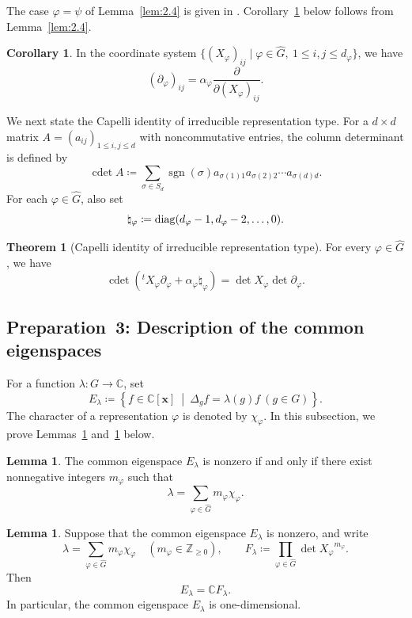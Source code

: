 \documentclass[12pt,a4paper]{article}
\theoremstyle{definition}
\newtheorem{thm}[definition]{Theorem}
\newtheorem{lem}[definition]{Lemma}
\newtheorem{cor}[definition]{Corollary}
\numberwithin{definition}{section}
\newcommand{\diag}{{\rm diag}}
\DeclareMathOperator{\sgn}{sgn}
\DeclareMathOperator{\Cdet}{cdet}
\begin{document}
The case $\varphi=\psi$ of Lemma~\ref{lem:2.4}
is given in \cite[Section~3]{MR3841213}.
Corollary~\ref{cor:2.5} below follows from Lemma~\ref{lem:2.4}.

\begin{cor}\label{cor:2.5}
In the coordinate system
$\{(X_\varphi)_{ij}\mid\varphi\in\widehat G,\ 1\leq i,j\leq d_\varphi\}$,
we have
\[
 (\partial_\varphi)_{ij}
 =
 \alpha_\varphi
 \frac{\partial}{\partial (X_\varphi)_{ij}}.
\]
\end{cor}

We next state the Capelli identity of irreducible representation type.
For a $d\times d$ matrix $A=(a_{ij})_{1\leq i,j\leq d}$ with noncommutative entries,
the column determinant is defined by
\[
\Cdet{A} \coloneqq \sum_{\sigma \in S_{d}} \sgn(\sigma) a_{\sigma(1) 1} a_{\sigma(2) 2} \cdots a_{\sigma(d) d}.
\]
For each $\varphi\in\widehat G$, also set
\[
\natural_{\varphi} \coloneqq \diag(d_{\varphi} - 1, d_{\varphi} - 2, \ldots, 0).
\]

\begin{thm}[Capelli identity of irreducible representation type]\label{thm:2.6}
For every $\varphi\in\widehat G$, we have
\[
\Cdet{\left( {}^t X_{\varphi} \partial_{\varphi} + \alpha_{\varphi} \natural_{\varphi} \right)} = \det{X_{\varphi}} \det{\partial_{\varphi}}.
\]
\end{thm}

\subsection{Preparation~3: Description of the common eigenspaces}\label{sec:2.3}

For a function $\lambda\colon G\to\mathbb C$, set
\[
E_{\lambda}
\coloneqq
\left\{
f \in \mathbb{C}[\bm{x}]
\ \middle|\
\Delta_{g} f = \lambda(g) f \ (g \in G)
\right\}.
\]
The character of a representation $\varphi$ is denoted by $\chi_\varphi$.
In this subsection, we prove Lemmas~\ref{lem:2.7} and~\ref{lem:2.8} below.

\begin{lem}\label{lem:2.7}
The common eigenspace $E_\lambda$ is nonzero if and only if
there exist nonnegative integers $m_\varphi$ such that
\[
\lambda
=
\sum_{\varphi \in \widehat{G}}
m_{\varphi} \chi_{\varphi}.
\]
\end{lem}

\begin{lem}\label{lem:2.8}
Suppose that the common eigenspace $E_\lambda$ is nonzero, and write
\[
 \lambda
 =
 \sum_{\varphi \in \widehat{G}}
 m_{\varphi} \chi_{\varphi}
 \quad(m_\varphi \in \mathbb{Z}_{\geq 0}), \qquad
 F_{\lambda} \coloneqq \prod_{\varphi \in \widehat{G}}
 \det{X_{\varphi}}^{m_{\varphi}}.
\]
Then
\[
 E_\lambda
 =
 \mathbb{C} F_{\lambda}.
\]
In particular, the common eigenspace $E_\lambda$ is one-dimensional.
\end{lem}
\end{document}
